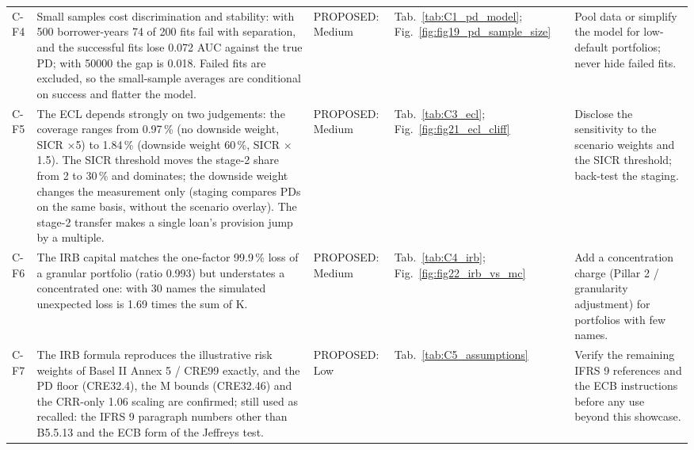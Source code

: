 \begin{table}[H]
\begin{tabular}{>{\raggedright\arraybackslash}p{0.75cm}>{\raggedright\arraybackslash}p{6.6cm}>{\raggedright\arraybackslash}p{1.85cm}>{\raggedright\arraybackslash}p{2.4cm}>{\raggedright\arraybackslash}p{3.5cm}}
C-F4 & Small samples cost discrimination and stability: with 500 borrower-years 74 of 200 fits fail with separation, and the successful fits lose 0.072 AUC against the true PD; with 50000 the gap is 0.018. Failed fits are excluded, so the small-sample averages are conditional on success and flatter the model. & PROPOSED: Medium & Tab.~\ref{tab:C1_pd_model}; Fig.~\ref{fig:fig19_pd_sample_size} & Pool data or simplify the model for low-default portfolios; never hide failed fits. \\
C-F5 & The ECL depends strongly on two judgements: the coverage ranges from 0.97\,\% (no downside weight, SICR $\times$5) to 1.84\,\% (downside weight 60\,\%, SICR $\times$1.5). The SICR threshold moves the stage-2 share from 2 to 30\,\% and dominates; the downside weight changes the measurement only (staging compares PDs on the same basis, without the scenario overlay). The stage-2 transfer makes a single loan's provision jump by a multiple. & PROPOSED: Medium & Tab.~\ref{tab:C3_ecl}; Fig.~\ref{fig:fig21_ecl_cliff} & Disclose the sensitivity to the scenario weights and the SICR threshold; back-test the staging. \\
C-F6 & The IRB capital matches the one-factor 99.9\,\% loss of a granular portfolio (ratio 0.993) but understates a concentrated one: with 30 names the simulated unexpected loss is 1.69 times the sum of K. & PROPOSED: Medium & Tab.~\ref{tab:C4_irb}; Fig.~\ref{fig:fig22_irb_vs_mc} & Add a concentration charge (Pillar 2 / granularity adjustment) for portfolios with few names. \\
C-F7 & The IRB formula reproduces the illustrative risk weights of Basel II Annex 5 / CRE99 exactly, and the PD floor (CRE32.4), the M bounds (CRE32.46) and the CRR-only 1.06 scaling are confirmed; still used as recalled: the IFRS 9 paragraph numbers other than B5.5.13 and the ECB form of the Jeffreys test. & PROPOSED: Low & Tab.~\ref{tab:C5_assumptions} & Verify the remaining IFRS 9 references and the ECB instructions before any use beyond this showcase. \\
\bottomrule
\end{tabular}
\end{table}

